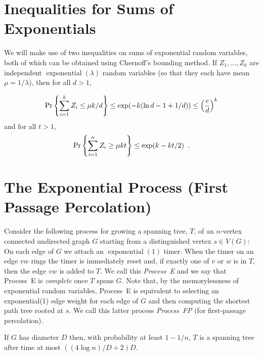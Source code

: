 \documentclass{patmorin}
\DeclareMathOperator{\exponential}{exponential}
\begin{document}
\section{Inequalities for Sums of Exponentials}

We will make use of two inequalities on sums of exponential random
variables, both of which can be obtained using Chernoff's bounding
method.  If $Z_1,\ldots,Z_k$ are independent $\exponential(\lambda)$
random variables (so that they each have mean $\mu=1/\lambda$), then
for all $d>1$,

\begin{equation}
    \Pr\left\{\sum_{i=1}^k Z_i \le \mu k/d\right\} \le \exp(-k(\ln d -1 + 1/d)) \le \left(\frac{e}{d}\right)^k  \eqlabel{head-bound}
\end{equation}
and for all $t>1$, 
\begin{equation}
    \Pr\left\{\sum_{i=1}^n Z_i \ge \mu k t\right\} \le \exp (k-kt/2) \enspace . \eqlabel{tail-bound}
\end{equation}



\section{The Exponential Process (First Passage Percolation)}

Consider the following process for growing a spanning tree, $T$, of an
$n$-vertex connected undirected graph $G$ starting from a distinguished
vertex $s\in V(G)$:  On each edge of $G$ we attach an $\exponential(1)$
timer.  When the timer on an edge $vw$ rings the timer is immediately
reset and, if exactly one of $v$ or $w$ is in $T$, then the edge $vw$
is added to $T$.  We call this \emph{Process~E} and we say that Process~E
is \emph{complete} once $T$ spans $G$.  Note that, by the memorylessness
of exponential random variables, Process~E is equivalent to selecting
an exponential(1) edge weight for each edge of $G$ and then computing
the shortest path tree rooted at $s$.  We call this latter process
\emph{Process~FP} (for first-passage percolation).

\begin{lem}
  If $G$ has diameter $D$ then, with probability at least $1-1/n$, $T$
  is a spanning tree after time at most $((4\log n)/D+2)D$.
\end{lem}
\end{document}
